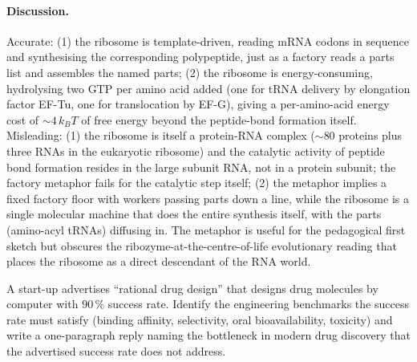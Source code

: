 \paragraph{Discussion.}
Accurate: (1) the ribosome is template-driven, reading mRNA codons
in sequence and synthesising the corresponding polypeptide, just as
a factory reads a parts list and assembles the named parts; (2) the
ribosome is energy-consuming, hydrolysing two GTP per amino acid
added (one for tRNA delivery by elongation factor EF-Tu, one for
translocation by EF-G), giving a per-amino-acid energy cost of
$\sim 4\,k_B T$ of free energy beyond the peptide-bond formation
itself. Misleading: (1) the ribosome is itself a protein-RNA complex
($\sim 80$ proteins plus three RNAs in the eukaryotic ribosome) and
the catalytic activity of peptide bond formation resides in the
large subunit RNA, not in a protein subunit; the factory metaphor
fails for the catalytic step itself; (2) the metaphor implies a
fixed factory floor with workers passing parts down a line, while
the ribosome is a single molecular machine that does the entire
synthesis itself, with the parts (amino-acyl tRNAs) diffusing in.
The metaphor is useful for the pedagogical first sketch but
obscures the ribozyme-at-the-centre-of-life evolutionary reading
that places the ribosome as a direct descendant of the RNA world.

\begin{exercise}
A start-up advertises ``rational drug design'' that designs drug
molecules by computer with $90\,\%$ success rate. Identify the
engineering benchmarks the success rate must satisfy (binding
affinity, selectivity, oral bioavailability, toxicity) and write a
one-paragraph reply naming the bottleneck in modern drug discovery
that the advertised success rate does not address.
\end{exercise}

